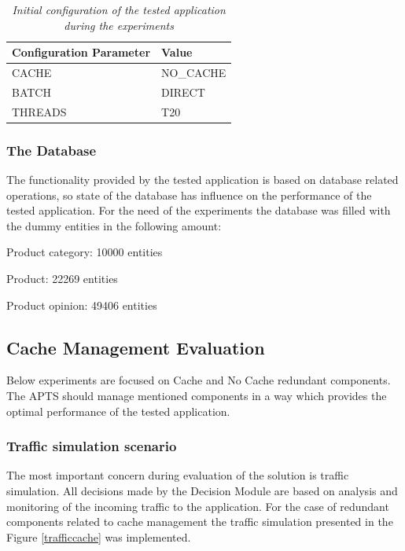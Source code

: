 \documentclass[10pt,a4paper]{article}
\let\tempone\itemize
\let\temptwo\enditemize
\renewenvironment{itemize}{\tempone\addtolength{\itemsep}{-0.4\baselineskip}}{\temptwo}
\begin{document}
\begin{table}[!htb]
\caption{\textit{Initial configuration of the tested application during the experiments}} \label{table:initconfiguration}
\begin{tabularx}{\textwidth}{X|X}
\textbf{Configuration Parameter} & \textbf{Value} \\ \hline
CACHE & NO\_CACHE \\ \hline
BATCH & DIRECT\\ \hline
THREADS & T20\\
\end{tabularx}
\end{table}

\subsubsection{The Database}

The functionality provided by the tested application is based on database related operations, so state of the database has influence on the performance of the tested application. For the need of the experiments the database was filled with the dummy entities in the following amount:

\begin{itemize}
\item Product category: 10000 entities
\item Product: 22269 entities
\item Product opinion: 49406 entities
\end{itemize}


\subsection{Cache Management Evaluation} \label{section:cachemenagementevaluation}

Below experiments are focused on Cache and No Cache redundant components. The APTS should manage mentioned components in a way which provides the optimal performance of the tested application.

\subsubsection{Traffic simulation scenario} \label{trafficcachesim}

The most important concern during evaluation of the solution is traffic simulation. All decisions made by the Decision Module are based on analysis and monitoring of the incoming traffic to the application. For the case of redundant components related to cache management the traffic simulation presented in the Figure \ref{trafficcache} was implemented.
\end{document}
